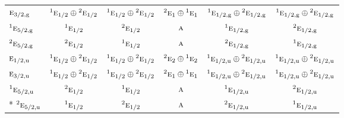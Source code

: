 \documentclass[10pt,a4paper]{article}
\numberwithin{equation}{section}
\newcommand{\irr}[1]{\text{\normalfont\scshape #1}}
\newcommand{\conjpair}[1]{{}^{#1}}
\newcommand{\ptag}[1]{\mathrm{#1}}
\begin{document}
{\begin{longtable}{@{}lccccc@{}}
$\irr{e}_{3/2,\ptag{g}}$ & $\conjpair{1}\irr{e}_{1/2}\oplus \conjpair{2}\irr{e}_{1/2}$ & $\conjpair{1}\irr{e}_{1/2}\oplus \conjpair{2}\irr{e}_{1/2}$ & $\conjpair{2}\irr{e}_{1}\oplus \conjpair{1}\irr{e}_{1}$ & $\conjpair{1}\irr{e}_{1/2,\ptag{g}}\oplus \conjpair{2}\irr{e}_{1/2,\ptag{g}}$ & $\conjpair{1}\irr{e}_{1/2,\ptag{g}}\oplus \conjpair{2}\irr{e}_{1/2,\ptag{g}}$\\
$\conjpair{1}\irr{e}_{5/2,\ptag{g}}$ & $\conjpair{1}\irr{e}_{1/2}$ & $\conjpair{2}\irr{e}_{1/2}$ & $\irr{a}$ & $\conjpair{1}\irr{e}_{1/2,\ptag{g}}$ & $\conjpair{2}\irr{e}_{1/2,\ptag{g}}$\\
$\conjpair{2}\irr{e}_{5/2,\ptag{g}}$ & $\conjpair{2}\irr{e}_{1/2}$ & $\conjpair{1}\irr{e}_{1/2}$ & $\irr{a}$ & $\conjpair{2}\irr{e}_{1/2,\ptag{g}}$ & $\conjpair{1}\irr{e}_{1/2,\ptag{g}}$\\
$\irr{e}_{1/2,\ptag{u}}$ & $\conjpair{1}\irr{e}_{1/2}\oplus \conjpair{2}\irr{e}_{1/2}$ & $\conjpair{1}\irr{e}_{1/2}\oplus \conjpair{2}\irr{e}_{1/2}$ & $\conjpair{2}\irr{e}_{2}\oplus \conjpair{1}\irr{e}_{2}$ & $\conjpair{1}\irr{e}_{1/2,\ptag{u}}\oplus \conjpair{2}\irr{e}_{1/2,\ptag{u}}$ & $\conjpair{1}\irr{e}_{1/2,\ptag{u}}\oplus \conjpair{2}\irr{e}_{1/2,\ptag{u}}$\\
$\irr{e}_{3/2,\ptag{u}}$ & $\conjpair{1}\irr{e}_{1/2}\oplus \conjpair{2}\irr{e}_{1/2}$ & $\conjpair{1}\irr{e}_{1/2}\oplus \conjpair{2}\irr{e}_{1/2}$ & $\conjpair{2}\irr{e}_{1}\oplus \conjpair{1}\irr{e}_{1}$ & $\conjpair{1}\irr{e}_{1/2,\ptag{u}}\oplus \conjpair{2}\irr{e}_{1/2,\ptag{u}}$ & $\conjpair{1}\irr{e}_{1/2,\ptag{u}}\oplus \conjpair{2}\irr{e}_{1/2,\ptag{u}}$\\
$\conjpair{1}\irr{e}_{5/2,\ptag{u}}$ & $\conjpair{2}\irr{e}_{1/2}$ & $\conjpair{1}\irr{e}_{1/2}$ & $\irr{a}$ & $\conjpair{1}\irr{e}_{1/2,\ptag{u}}$ & $\conjpair{2}\irr{e}_{1/2,\ptag{u}}$\\*
$\conjpair{2}\irr{e}_{5/2,\ptag{u}}$ & $\conjpair{1}\irr{e}_{1/2}$ & $\conjpair{2}\irr{e}_{1/2}$ & $\irr{a}$ & $\conjpair{2}\irr{e}_{1/2,\ptag{u}}$ & $\conjpair{1}\irr{e}_{1/2,\ptag{u}}$\\
\bottomrule\end{longtable}}
\end{document}
